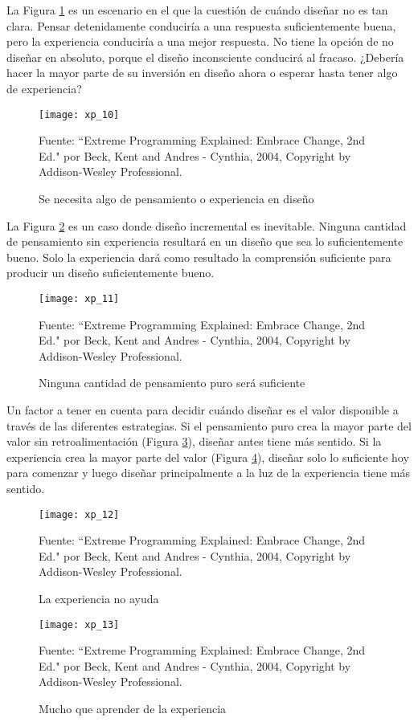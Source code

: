 \begin{spacing}{1.5}
				La Figura \ref{figure:chaperII_11} es un escenario en el que la cuestión de cuándo diseñar no es tan clara. Pensar detenidamente conduciría a una respuesta suficientemente buena, pero la experiencia conduciría a una mejor respuesta. No tiene la opción de no diseñar en absoluto, porque el diseño inconsciente conducirá al fracaso. ¿Debería hacer la mayor parte de su inversión en diseño ahora o esperar hasta tener algo de experiencia?
				
				\begin{figure}[H]
					\centering
					\texttt{[image: xp\_10]}
					\caption {\centering \small{Se necesita algo de pensamiento o experiencia en diseño}} \label{figure:chaperII_11}
					\small {Fuente: ``Extreme Programming Explained: Embrace Change, 2nd Ed." por Beck, Kent and Andres - Cynthia, 2004, Copyright by Addison-Wesley Professional.}
				\end{figure}
				
				La Figura \ref{figure:chaperII_12} es un caso donde diseño incremental es inevitable. Ninguna cantidad de pensamiento sin experiencia resultará en un diseño que sea lo suficientemente bueno. Solo la experiencia dará como resultado la comprensión suficiente para producir un diseño suficientemente bueno.
				
				\begin{figure}[H]
					\centering
					\texttt{[image: xp\_11]}
					\caption {\centering \small{Ninguna cantidad de pensamiento puro será suficiente}} \label{figure:chaperII_12}
					\small {Fuente: ``Extreme Programming Explained: Embrace Change, 2nd Ed." por Beck, Kent and Andres - Cynthia, 2004, Copyright by Addison-Wesley Professional.}
				\end{figure}
								
				Un factor a tener en cuenta para decidir cuándo diseñar es el valor disponible a través de las diferentes estrategias. Si el pensamiento puro crea la mayor parte del valor sin retroalimentación (Figura \ref{figure:chaperII_13}), diseñar antes tiene más sentido. Si la experiencia crea la mayor parte del valor (Figura \ref{figure:chaperII_14}), diseñar solo lo suficiente hoy para comenzar y luego diseñar principalmente a la luz de la experiencia tiene más sentido.
				
				\begin{figure}[H]
					\centering
					\texttt{[image: xp\_12]}
					\caption {\centering \small{La experiencia no ayuda}} \label{figure:chaperII_13}
					\small {Fuente: ``Extreme Programming Explained: Embrace Change, 2nd Ed." por Beck, Kent and Andres - Cynthia, 2004, Copyright by Addison-Wesley Professional.}
				\end{figure}
				\begin{figure}[H]
					\centering
					\texttt{[image: xp\_13]}
					\caption {\centering \small{Mucho que aprender de la experiencia}} \label{figure:chaperII_14}
					\small {Fuente: ``Extreme Programming Explained: Embrace Change, 2nd Ed." por Beck, Kent and Andres - Cynthia, 2004, Copyright by Addison-Wesley Professional.}
				\end{figure}
				

\end{spacing}
